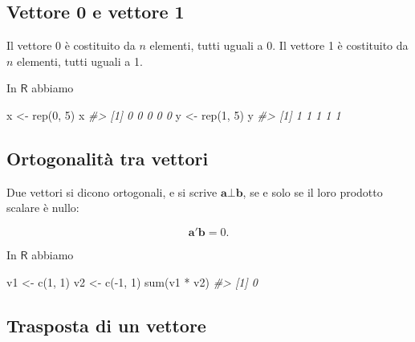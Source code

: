 \documentclass[
  11pt,
]{krantz}
\makeatletter
\newenvironment{Shaded}{\begin{snugshade}}{\end{snugshade}}
\newcommand{\CommentTok}[1]{\textcolor[rgb]{0.37,0.37,0.37}{\textit{#1}}}
\newcommand{\DecValTok}[1]{\textcolor[rgb]{0.06,0.06,0.06}{#1}}
\newcommand{\FunctionTok}[1]{\textcolor[rgb]{0,0,0}{#1}}
\newcommand{\NormalTok}[1]{#1}
\newcommand{\OtherTok}[1]{\textcolor[rgb]{0.37,0.37,0.37}{#1}}
\newcommand{\SpecialCharTok}[1]{\textcolor[rgb]{0,0,0}{#1}}
\newenvironment{kframe}{%
\medskip{}
\setlength{\fboxsep}{.8em}
 \def\at@end@of@kframe{}%
 \ifinner\ifhmode%
  \def\at@end@of@kframe{\end{minipage}}%
  \begin{minipage}{\columnwidth}%
 \fi\fi%
 \def\FrameCommand##1{\hskip\@totalleftmargin \hskip-\fboxsep
 \colorbox{shadecolor}{##1}\hskip-\fboxsep
     \hskip-\linewidth \hskip-\@totalleftmargin \hskip\columnwidth}%
 \MakeFramed {\advance\hsize-\width
   \@totalleftmargin\z@ \linewidth\hsize
   \@setminipage}}%
 {\par\unskip\endMakeFramed%
 \at@end@of@kframe}
\renewenvironment{Shaded}{\begin{kframe}}{\end{kframe}}
\theoremstyle{definition}
\theoremstyle{definition}
\theoremstyle{definition}
\theoremstyle{definition}
\theoremstyle{remark}
\makeatother
\begin{document}
\hypertarget{vettore-0-e-vettore-1}{%
\subsection{Vettore 0 e vettore 1}\label{vettore-0-e-vettore-1}}

Il vettore 0 è costituito da \(n\) elementi, tutti uguali a 0. Il vettore 1 è costituito da \(n\) elementi, tutti uguali a 1.

In \(\mathsf{R}\) abbiamo

\begin{Shaded}
\begin{Highlighting}[]
\NormalTok{x }\OtherTok{\textless{}{-}} \FunctionTok{rep}\NormalTok{(}\DecValTok{0}\NormalTok{, }\DecValTok{5}\NormalTok{)}
\NormalTok{x}
\CommentTok{\#\textgreater{} [1] 0 0 0 0 0}
\NormalTok{y }\OtherTok{\textless{}{-}} \FunctionTok{rep}\NormalTok{(}\DecValTok{1}\NormalTok{, }\DecValTok{5}\NormalTok{)}
\NormalTok{y}
\CommentTok{\#\textgreater{} [1] 1 1 1 1 1}
\end{Highlighting}
\end{Shaded}

\hypertarget{ortogonalituxe0-tra-vettori}{%
\subsection{Ortogonalità tra vettori}\label{ortogonalituxe0-tra-vettori}}

Due vettori si dicono ortogonali, e si scrive \(\boldsymbol{a} \bot \boldsymbol{b}\), se e solo se il loro prodotto scalare è nullo:

\[
\boldsymbol{a}'\boldsymbol{b} = 0.
\]

In \(\mathsf{R}\) abbiamo

\begin{Shaded}
\begin{Highlighting}[]
\NormalTok{v1 }\OtherTok{\textless{}{-}} \FunctionTok{c}\NormalTok{(}\DecValTok{1}\NormalTok{, }\DecValTok{1}\NormalTok{)}
\NormalTok{v2 }\OtherTok{\textless{}{-}} \FunctionTok{c}\NormalTok{(}\SpecialCharTok{{-}}\DecValTok{1}\NormalTok{, }\DecValTok{1}\NormalTok{)}
\FunctionTok{sum}\NormalTok{(v1 }\SpecialCharTok{*}\NormalTok{ v2)}
\CommentTok{\#\textgreater{} [1] 0}
\end{Highlighting}
\end{Shaded}

\hypertarget{trasposta-di-un-vettore}{%
\subsection{Trasposta di un vettore}\label{trasposta-di-un-vettore}}
\end{document}
